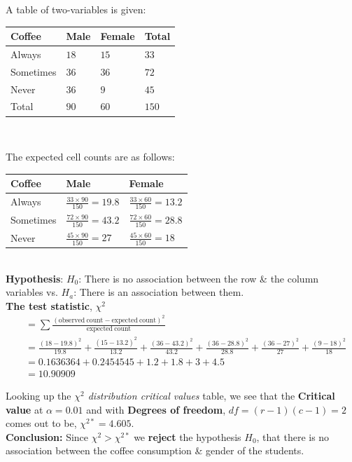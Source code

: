 \documentclass[boxes, qed]{homework}
\begin{document}
\begin{problem}
  A table of two-variables is given:\\
 
  \begin{tabular}{l|l|l|l}
    \hline
    Coffee & Male & Female & Total \\
    \hline
    Always &    $18$ & $15$ & $33$ \\
    Sometimes & $36$ & $36$ & $72$ \\
    Never &     $36$ & $9$ &  $45$ \\
    \hline
    Total &     $90$ & $60$ & $150$ \\
    \hline
  \end{tabular}\\
\end{problem}
\begin{solution}
  The expected cell counts are as follows:\\

  \begin{tabular}{l|l|l}
    \hline
    Coffee & Male & Female \\
    \hline
    Always &    $\frac{33\times 90}{150}=19.8$ & $\frac{33\times 60}{150}=13.2$ \\
    Sometimes & $\frac{72\times 90}{150}=43.2$ & $\frac{72\times 60}{150}=28.8$ \\
    Never &     $\frac{45\times 90}{150}=27$ & $\frac{45\times 60}{150}=18$ \\
    \hline
  \end{tabular}\\

  \textbf{Hypothesis}: $H_0$: There is no association between the row \& the column variables vs.
  $H_a$: There is an association between them. \\

  \textbf{The test statistic}, $\chi^2$
  \begin{align*}
    &=\sum{\frac{(\mathrm{observed\ count}-\mathrm{expected\ count})^2}{\mathrm{expected\ count}}}\\
    &=\frac{(18-19.8)^2}{19.8} 
    +\frac{(15-13.2)^2}{13.2} 
    +\frac{(36-43.2)^2}{43.2} 
    +\frac{(36-28.8)^2}{28.8}
    +\frac{(36-27)^2}{27}
    +\frac{(9-18)^2}{18}\\
    &=0.1636364+0.2454545+1.2+1.8+3+4.5\\
    &=10.90909
  \end{align*}

  Looking up the \textit{$\chi^2$ distribution critical values} table, we see that
  the \textbf{Critical value} at $\alpha=0.01$ and
  with \textbf{Degrees of freedom}, $df=(r-1)(c-1)=2$ comes out to be,
  $\chi^{2*}=4.605$.\\

  \textbf{Conclusion:}
  Since $\chi^2>\chi^{2*}$ we \textbf{reject} the hypothesis $H_0$, that there 
  is no association between the coffee consumption \& gender of the students.
\end{solution}
\end{document}
